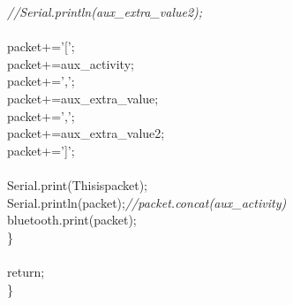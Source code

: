\documentclass[a4paper, 12pt]{article}
\newcommand\SPC{\hspace*{0.6em}}
\newcommand\QOT{\mbox{\char 34}}
\newcommand{\CppACharacter}[1]{\textcolor[rgb]{0.2,0.4,1}{#1}}
\newcommand{\CppAComment}[1]{\textit{\textcolor[rgb]{0.2,0.4,1}{#1}}}
\newcommand{\CppAIdentifier}[1]{\textcolor[rgb]{0,1,0}{#1}}
\newcommand{\CppAReservedWord}[1]{\textcolor[rgb]{0,0.5,0}{#1}}
\newcommand{\CppASpace}[1]{\textcolor[rgb]{1,1,1}{\colorbox[rgb]{0,0,0}{#1}}}
\newcommand{\CppAString}[1]{\textcolor[rgb]{0.76,0.76,0.76}{#1}}
\newcommand{\CppASymbol}[1]{\textcolor[rgb]{1,0,0}{#1}}
\begin{document}
\begin{ttfamily}
\CppASpace{\SPC \SPC \SPC \SPC }\CppAComment{//Serial.println(aux\_extra\_value2);}\\
\\
\CppASpace{\SPC \SPC \SPC \SPC }\CppAIdentifier{packet}\CppASpace{\SPC }\CppASymbol{+=}\CppASpace{\SPC }\CppACharacter{'['}\CppASymbol{;}\\
\CppASpace{\SPC \SPC \SPC \SPC }\CppAIdentifier{packet}\CppASpace{\SPC }\CppASymbol{+=}\CppASpace{\SPC }\CppAIdentifier{aux\_activity}\CppASymbol{;}\CppASpace{\SPC }\\
\CppASpace{\SPC \SPC \SPC \SPC }\CppAIdentifier{packet}\CppASpace{\SPC }\CppASymbol{+=}\CppASpace{\SPC }\CppACharacter{','}\CppASymbol{;}\\
\CppASpace{\SPC \SPC \SPC \SPC }\CppAIdentifier{packet}\CppASpace{\SPC }\CppASymbol{+=}\CppASpace{\SPC }\CppAIdentifier{aux\_extra\_value}\CppASymbol{;}\\
\CppASpace{\SPC \SPC \SPC \SPC }\CppAIdentifier{packet}\CppASpace{\SPC }\CppASymbol{+=}\CppASpace{\SPC }\CppACharacter{','}\CppASymbol{;}\\
\CppASpace{\SPC \SPC \SPC \SPC }\CppAIdentifier{packet}\CppASpace{\SPC }\CppASymbol{+=}\CppASpace{\SPC }\CppAIdentifier{aux\_extra\_value2}\CppASymbol{;}\\
\CppASpace{\SPC \SPC \SPC \SPC }\CppAIdentifier{packet}\CppASpace{\SPC }\CppASymbol{+=}\CppASpace{\SPC }\CppACharacter{']'}\CppASymbol{;}\\
\\
\CppASpace{\SPC \SPC \SPC \SPC }\CppAIdentifier{Serial}\CppASymbol{.}\CppAIdentifier{print}\CppASymbol{(}\CppAString{\QOT This\SPC is\SPC packet\QOT }\CppASymbol{)}\CppASymbol{;}\\
\CppASpace{\SPC \SPC \SPC \SPC }\CppAIdentifier{Serial}\CppASymbol{.}\CppAIdentifier{println}\CppASymbol{(}\CppAIdentifier{packet}\CppASymbol{)}\CppASymbol{;}\CppASpace{\SPC \SPC \SPC \SPC \SPC \SPC \SPC \SPC \SPC \SPC \SPC \SPC \SPC }\CppAComment{//packet.concat(aux\_activity)}\\
\CppASpace{\SPC \SPC \SPC \SPC }\CppAIdentifier{bluetooth}\CppASymbol{.}\CppAIdentifier{print}\CppASymbol{(}\CppAIdentifier{packet}\CppASymbol{)}\CppASymbol{;}\\
\CppASpace{\SPC \SPC }\CppASymbol{\}}\\
\CppASpace{\SPC \SPC }\\
\CppAReservedWord{return}\CppASymbol{;}\\
\CppASymbol{\}}\\
\\

\end{ttfamily}
\end{document}
